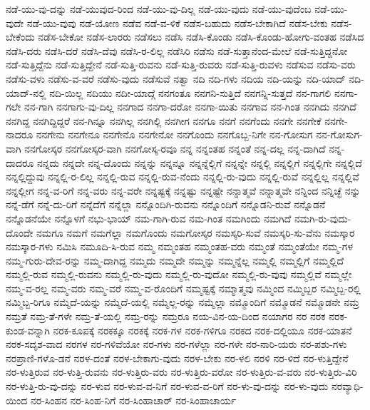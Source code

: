 {ನಡೆ-ಯು-ವು-ದನ್ನು
ನಡೆ-ಯುವುದ-ರಿಂದ
ನಡೆ-ಯು-ವು-ದಿಲ್ಲ
ನಡೆ-ಯು-ವುದು
ನಡೆ-ಯು-ವುದೆಂಬ
ನಡೆ-ಯು-ವುದೇ
ನಡೆ-ಯು-ವುವು
ನಡೆ-ಯೋಣ
ನಡೆವ
ನಡೆ-ವ-ಳಿಕೆ
ನಡೆಸ-ಬಹುದು
ನಡೆಸ-ಬೇಕಾಗಿದೆ
ನಡೆಸ-ಬೇಕು
ನಡೆಸ-ಬೇಕೆಂದು
ನಡೆಸ-ಬೇಕೋ
ನಡೆಸ-ಲಾರರು
ನಡೆಸಲು
ನಡೆಸಿ
ನಡೆಸಿ-ಕೊಂಡು
ನಡೆಸಿ-ಕೊಂಡು-ಹೋಗು-ವಂತಹ
ನಡೆಸಿದ
ನಡೆಸಿ-ದರು
ನಡೆಸಿ-ದರೆ
ನಡೆಸಿ-ದೆವು
ನಡೆಸಿ-ರ-ಲಿಲ್ಲ
ನಡೆಸಿರಿ
ನಡೆಸು
ನಡೆ-ಸುತ್ತಾನೆಂದ-ಮೇಲೆ
ನಡೆ-ಸುತ್ತಿದ್ದನೋ
ನಡೆ-ಸುತ್ತಿದ್ದೆನು
ನಡೆ-ಸುತ್ತಿದ್ದೇನೆ
ನಡೆ-ಸುತ್ತಿ-ರುವನು
ನಡೆ-ಸುತ್ತಿ-ರುವರು
ನಡೆ-ಸುತ್ತಿ-ರುವಳು
ನಡೆಸುವ
ನಡೆಸು-ವರು
ನಡೆಸು-ವಳು
ನಡೆಸು-ವ-ವರೆ
ನಡೆಸು-ವುದು
ನಡೆಸುವೆ
ನತ್ವಾ
ನದಿ
ನದಿ-ಗಳು
ನದಿಯ
ನದಿ-ಯನ್ನು
ನದಿ-ಯಾದ್
ನದಿ-ಯಾದ್-ನಲ್ಲಿ
ನದಿ-ಯಿಲ್ಲ
ನದಿಯು
ನದೀ-ಯಾದ್ಗೆ
ನನಗಂತೂ
ನನಗನಿ-ಸುತ್ತಿದೆ
ನನಗನ್ನಿ-ಸುತ್ತದೆ
ನನ-ಗಾಗಲಿ
ನನಗಾ-ಗಲೇ
ನನ-ಗಾಗಿ
ನನಗಾಗು-ವು-ದಿಲ್ಲ
ನನಗಾದ
ನನಗಾ-ದರೋ
ನನಗಾ-ಯಿತು
ನನಗಾವ
ನನ-ಗಿಂತ
ನನಗಿದು
ನನಗಿದೆ
ನನಗಿದ್ದ
ನನಗಿದ್ದಿದ್ದರೆ
ನನ-ಗಿನ್ನೂ
ನನಗಿಲ್ಲ
ನನಗಿಲ್ಲಿ
ನನಗೀಗ
ನನಗೂ
ನನಗೆ
ನನಗೆಂದು
ನನಗೇ
ನನಗೇಕೆ
ನನಗೇ-ನಾದರೂ
ನನಗೇನು
ನನಗೇನೂ
ನನಗೇನೊ
ನನಗೇನೋ
ನನಗೊಂದು
ನನಗೊಬ್ಬ-ನಿಗೇ
ನನ-ಗೋಸುಗ
ನನ-ಗೋಸುಗ-ವಾಗಿ
ನನಗೋಸ್ಕರ
ನನಗೋಸ್ಕರ-ವಾಗಿ
ನನಗೋಸ್ಕ-ರವೂ
ನನ್ನ
ನನ್ನಂತಹ
ನನ್ನಂತೆ
ನನ್ನ-ದಲ್ಲ
ನನ್ನ-ದಾಗಿದೆ
ನನ್ನ-ದಾದರೂ
ನನ್ನದು
ನನ್ನದೇ
ನನ್ನ-ದೊಂದು
ನನ್ನನ್ನು
ನನ್ನನ್ನೂ
ನನ್ನನ್ನೆಲ್ಲಿಗೆ
ನನ್ನನ್ನೇ
ನನ್ನಲ್ಲಿ
ನನ್ನಲ್ಲಿಗೆ
ನನ್ನಲ್ಲಿಗೇ
ನನ್ನಲ್ಲಿದೆ
ನನ್ನಲ್ಲಿದ್ದುವು
ನನ್ನಲ್ಲಿ-ರ-ಲಿಲ್ಲ
ನನ್ನಲ್ಲಿ-ರುವ
ನನ್ನಲ್ಲಿ-ರುವ-ನೆಂದು
ನನ್ನಲ್ಲಿ-ರು-ವುದು
ನನ್ನಲ್ಲಿ-ರುವೆ
ನನ್ನಲ್ಲಿಲ್ಲ
ನನ್ನಲ್ಲಿವೆ
ನನ್ನಲ್ಲೀಗ
ನನ್ನ-ವ-ರಿಗೆ
ನನ್ನ-ವರು
ನನ್ನ-ವರೇ
ನನ್ನಷ್ಟಕ್ಕೆ
ನನ್ನಷ್ಟು
ನನ್ನಷ್ಟೇ
ನನ್ನಾತ್ಮವೆ
ನನ್ನಾತ್ಮವೇ
ನನ್ನಿಂದ
ನನ್ನಿಚ್ಛೆ
ನನ್ನು
ನನ್ನೆ-ಡೆಗೆ
ನನ್ನೆ-ದು-ರಿಗೆ
ನನ್ನೆದೆಗೆ
ನನ್ನೆಲ್ಲಾ
ನನ್ನೊಂದಿಗಿ-ರುವನು
ನನ್ನೊಂದಿಗೆ
ನನ್ನೊಡನಿ-ರುವೆ
ನನ್ನೊಡನೆ
ನನ್ನೊಡನೆಯೇ
ನನ್ನೊಳಗೆ
ನಭು-ಭಾಯ್
ನಮ-ಗಾಗಿ-ರುವ
ನಮ-ಗಿಂತ
ನಮಗಿಂದು
ನಮಗಿದೆ
ನಮಗಿ-ರು-ವುದು-ದೊಂದೇ
ನಮಗೂ
ನಮಗೆ
ನಮಗೆಲ್ಲಾ
ನಮಗೊಂದು
ನಮಗೋಸ್ಕರ
ನಮಸ್ಕರಿ-ಸುವೆ
ನಮಸ್ಕರಿ-ಸು-ವೆನು
ನಮಸ್ಕಾರ
ನಮಸ್ಕಾರ-ಗಳು
ನಮಿಸಿ
ನಮೂದಿ-ಸಿ-ರುವ
ನಮ್ಮ
ನಮ್ಮಂತಹ
ನಮ್ಮಂತಹ-ವರು
ನಮ್ಮಂತೆ
ನಮ್ಮಂತೆಯೇ
ನಮ್ಮ-ಗಳ
ನಮ್ಮ-ಗುರು-ದೇವ-ರನ್ನು
ನಮ್ಮ-ದಾಗಿದ್ದ
ನಮ್ಮದು
ನಮ್ಮದೇ
ನಮ್ಮನ್ನು
ನಮ್ಮನ್ನೆಲ್ಲ
ನಮ್ಮಲ್ಲಿ
ನಮ್ಮಲ್ಲಿಗೆ
ನಮ್ಮಲ್ಲಿದೆ
ನಮ್ಮಲ್ಲಿ-ರುವ
ನಮ್ಮಲ್ಲಿ-ರುವನು
ನಮ್ಮಲ್ಲಿ-ರು-ವುದು
ನಮ್ಮಲ್ಲಿ-ರು-ವುದೋ
ನಮ್ಮಲ್ಲಿ-ರು-ವುವು
ನಮ್ಮಲ್ಲಿವೆ
ನಮ್ಮಲ್ಲೇ
ನಮ್ಮ-ವ-ರಲ್ಲ
ನಮ್ಮ-ವರು
ನಮ್ಮ-ವರೆ
ನಮ್ಮ-ವ-ರೊಂದಿಗೆ
ನಮ್ಮಷ್ಟಕ್ಕೆ
ನಮ್ಮಾತ್ಮವು
ನಮ್ಮಿಂದ
ನಮ್ಮಿಬ್ಬರ
ನಮ್ಮಿಬ್ಬ-ರಲ್ಲಿ
ನಮ್ಮಿಬ್ಬ-ರಿಗೂ
ನಮ್ಮೆದೆ-ಯನ್ನು
ನಮ್ಮೆದೆ-ಯಲ್ಲಿ
ನಮ್ಮೆಲ್ಲ-ರನ್ನು
ನಮ್ಮೆಲ್ಲಾ
ನಮ್ಮೊಂದಿಗೆ
ನಮ್ಮೊಡನೆ
ನಮ್ಮೊಡನೇ
ನಮ್ರ
ನಮ್ರತೆ
ನಮ್ರ-ತೆ-ಗಳೇ
ನಮ್ರ-ತೆ-ಯಲ್ಲಿ
ನಮ್ರ-ರನ್ನು
ನಮ್ರರೂ
ನಯ-ವಿನ-ಯ-ದಿಂದ
ನಯಾಗರ
ನರ
ನರಕ
ನರಕ-ಕುಂಡ-ವನ್ನಾಗಿ
ನರಕ-ಕೂಪಕ್ಕೆ
ನರಕಕ್ಕೂ
ನರಕಕ್ಕೆ
ನರಕ-ಗಳ
ನರಕ-ಗಳಿಗೂ
ನರಕದ
ನರಕ-ದಲ್ಲಿಯೂ
ನರಕ-ಯಾತನೆ
ನರಕ-ಸದೃಶ-ವಾದ
ನರಗಳ
ನರ-ಗಳಿವೆಯೋ
ನರ-ಗಳು
ನರ-ಗಳೆಲ್ಲಾ
ನರ-ಗಳೇ
ನರ-ನಾರಿ-ಯರು
ನರ-ಪಶು-ಗಳು
ನರಪ್ರಾಣಿ-ಗಳೊ-ಡನೆ
ನರಳ-ದಂತೆ
ನರಳ-ಬೇಕಾಗು-ವುದು
ನರಳ-ಬೇಕು
ನರ-ಳಲಿ
ನರಳಿ
ನರ-ಳಿದೆ
ನರ-ಳುತ್ತಿದ್ದೇನೆ
ನರ-ಳುತ್ತಿರುವ
ನರ-ಳುತ್ತಿ-ರುವನು
ನರ-ಳುತ್ತಿರು-ವರು
ನರ-ಳುತ್ತಿರು-ವರೋ
ನರ-ಳುತ್ತಿರು-ವ-ವರು
ನರ-ಳುತ್ತಿರು-ವಿರಿ
ನರ-ಳುತ್ತಿ-ರು-ವು-ದನ್ನು
ನರ-ಳುವ
ನರ-ಳುವ-ವ-ನಿಗೆ
ನರ-ಳುವ-ವ-ರಿಗೆ
ನರ-ಳು-ವು-ದನ್ನು
ನರ-ಳು-ವುದು
ನರವ್ಯಾಧಿ-ಯಿಂದ
ನರ-ಸಿಂಹನ
ನರ-ಸಿಂಹ-ನಿಗೆ
ನರ-ಸಿಂಹಾಚಾರ್
ನರ-ಸಿಂಹಾಚಾರ್ಯ
}

